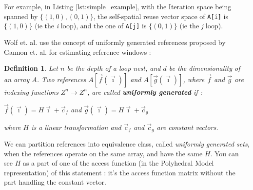\documentclass[paper=a4, fontsize=11pt]{scrartcl}
\newtheorem{defn}{Definition}[section]
\numberwithin{equation}{section}        %
\numberwithin{figure}{section}          %
\numberwithin{table}{section}               %
\begin{document}
            For example, in Listing \ref{lst:simple_example}, with the Iteration
            space being spanned by $\{(1,0),(0,1)\}$, the self-spatial reuse vector space of
            \verb'A[i]' is $\{(1,0)\}$ (ie the {\it i} loop), and the one of \verb'A[j]' is $\{(0,1)\}$
            (ie the {\it j} loop).

            Wolf et. al. use the concept of uniformly generated references proposed
            by Gannon et. al.\cite{Gannon:1988:SCL:50454.50460} for estimating reference
            windows :
            \begin{defn}
            \label{sec:uniformly_generated}
                Let $n$ be the depth of a loop nest, and $d$ be the dimensionality of
                an array $A$. Two references $A[\vec{f}(\vec{\imath})]$ and
                $A[\vec{g}(\vec{\imath})]$, where $\vec{f}$ and $\vec{g}$ are indexing
                functions $Z^{n} \rightarrow Z^{n}$, are called \textbf{uniformly generated} if :
                \begin{center}
                    $\vec{f}(\vec{\imath}) = H\vec{\imath}+\vec{c}_f$ and $\vec{g}(\vec{\imath}) = H\vec{\imath}+\vec{c}_g$
                \end{center}
                where $H$ is a linear transformation and $\vec{c}_f$ and $\vec{c}_g$ are constant vectors.
            \end{defn}
            
            We can partition references into equivalence class, called \textit{uniformly generated sets},
            when the references operate on the same array, and have the same $H$.
            You can see $H$ as a part of one of the access function (in the Polyhedral Model representation) of this statement :
            it's the access function matrix without the part handling the constant vector.
\end{document}
